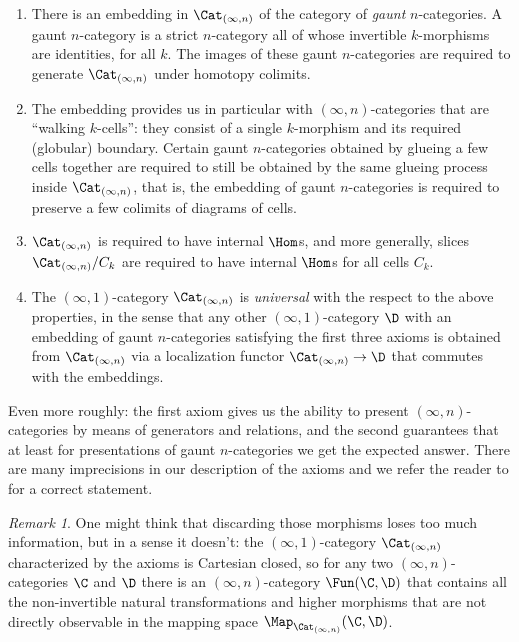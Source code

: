 \documentclass{conm-p-l}
\theoremstyle{definition} \newtheorem{definition}[theorem]{Definition}
\theoremstyle{remark} \newtheorem{remark}[theorem]{Remark}
\numberwithin{equation}{section}
\newcommand{\oo}{\infty}
\newcommand{\io}{$(\oo,1)$}
\newcommand{\Catin}{\Cat_{(\oo,n)}}
\begin{document}
\begin{enumerate}
  \item There is an embedding in $\Catin$ of the category of
    \emph{gaunt} $n$-categories. A gaunt $n$-category is a strict
    $n$-category all of whose invertible $k$-morphisms are identities,
    for all $k$. The images of these gaunt $n$-categories are
    required to generate $\Catin$ under homotopy colimits.
  \item The embedding provides us in particular with
    $(\oo,n)$-categories that are ``walking $k$-cells'': they consist
    of a single $k$-morphism and its required (globular) boundary.
    Certain gaunt $n$-categories obtained by glueing a few cells
    together are required to still be obtained by the same glueing
    process inside $\Catin$, that is, the embedding of gaunt
    $n$-categories is required to preserve a few colimits of diagrams
    of cells.
  \item $\Catin$ is required to have internal $\Hom$s, and more
    generally, slices $\Catin/C_k$ are required to have internal
    $\Hom$s for all cells $C_k$.
  \item The \io-category $\Catin$ is \emph{universal} with the respect
    to the above properties, in the sense that any other \io-category
    $\D$ with an embedding of gaunt $n$-categories satisfying the first
    three axioms is obtained from $\Catin$ via a localization functor
    $\Catin \to \D$ that commutes with the embeddings.
\end{enumerate}

Even more roughly: the first axiom gives us the ability to present
$(\oo,n)$-categories by means of generators and relations, and the
second guarantees that at least for presentations of gaunt
$n$-categories we get the expected answer. There are many imprecisions
in our description of the axioms and we refer the reader to
\cite{ClarkChris} for a correct statement.

\begin{remark}
  One might think that discarding those morphisms loses too much
  information, but in a sense it doesn't: the \io-category
  $\Catin$ characterized by the axioms is Cartesian closed, so
  for any two $(\oo,n)$-categories $\C$ and $\D$ there is an
  $(\oo,n)$-category $\Fun(\C,\D)$ that contains all the non-invertible
  natural transformations and higher morphisms that are not directly
  observable in the mapping space $\Map_{\Catin}(\C,\D)$.
\end{remark}
\end{document}
